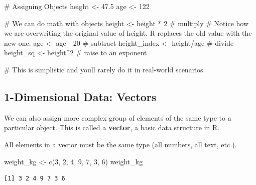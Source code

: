 \documentclass[
  letterpaper,
  DIV=11,
  numbers=noendperiod]{scrartcl}
\newenvironment{Shaded}{\begin{snugshade}}{\end{snugshade}}
\newcommand{\CommentTok}[1]{\textcolor[rgb]{0.37,0.37,0.37}{#1}}
\newcommand{\DecValTok}[1]{\textcolor[rgb]{0.68,0.00,0.00}{#1}}
\newcommand{\FloatTok}[1]{\textcolor[rgb]{0.68,0.00,0.00}{#1}}
\newcommand{\FunctionTok}[1]{\textcolor[rgb]{0.28,0.35,0.67}{#1}}
\newcommand{\NormalTok}[1]{\textcolor[rgb]{0.00,0.23,0.31}{#1}}
\newcommand{\OtherTok}[1]{\textcolor[rgb]{0.00,0.23,0.31}{#1}}
\newcommand{\SpecialCharTok}[1]{\textcolor[rgb]{0.37,0.37,0.37}{#1}}
\begin{document}
\begin{Shaded}
\begin{Highlighting}[]
\CommentTok{\# Assigning Objects}
\NormalTok{height }\OtherTok{\textless{}{-}} \FloatTok{47.5}           
\NormalTok{age }\OtherTok{\textless{}{-}} \DecValTok{122}

\CommentTok{\# We can do math with objects}
\NormalTok{height }\OtherTok{\textless{}{-}}\NormalTok{ height }\SpecialCharTok{*} \DecValTok{2}    \CommentTok{\# multiply}
\CommentTok{\# Notice how we are overwriting the original value of height. R replaces the old value with the new one.}
\NormalTok{age }\OtherTok{\textless{}{-}}\NormalTok{ age }\SpecialCharTok{{-}} \DecValTok{20}         \CommentTok{\# subtract}
\NormalTok{height\_index }\OtherTok{\textless{}{-}}\NormalTok{ height}\SpecialCharTok{/}\NormalTok{age  }\CommentTok{\# divide}
\NormalTok{height\_sq }\OtherTok{\textless{}{-}}\NormalTok{ height}\SpecialCharTok{\^{}}\DecValTok{2}       \CommentTok{\# raise to an exponent}

\CommentTok{\# This is simplistic and you\textquotesingle{}ll rarely do it in real{-}world scenarios. }
\end{Highlighting}
\end{Shaded}

\subsection{1-Dimensional Data: Vectors}\label{dimensional-data-vectors}

We can also assign more complex group of elements of the same type to a
particular object. This is called a \textbf{vector}, a basic data
structure in R.

All elements in a vector must be the same type (all numbers, all text,
etc.).

\begin{Shaded}
\begin{Highlighting}[]
\NormalTok{weight\_kg }\OtherTok{\textless{}{-}} \FunctionTok{c}\NormalTok{(}\DecValTok{3}\NormalTok{, }\DecValTok{2}\NormalTok{, }\DecValTok{4}\NormalTok{, }\DecValTok{9}\NormalTok{, }\DecValTok{7}\NormalTok{, }\DecValTok{3}\NormalTok{, }\DecValTok{6}\NormalTok{)}
\NormalTok{weight\_kg}
\end{Highlighting}
\end{Shaded}

\begin{verbatim}
[1] 3 2 4 9 7 3 6
\end{verbatim}
\end{document}

